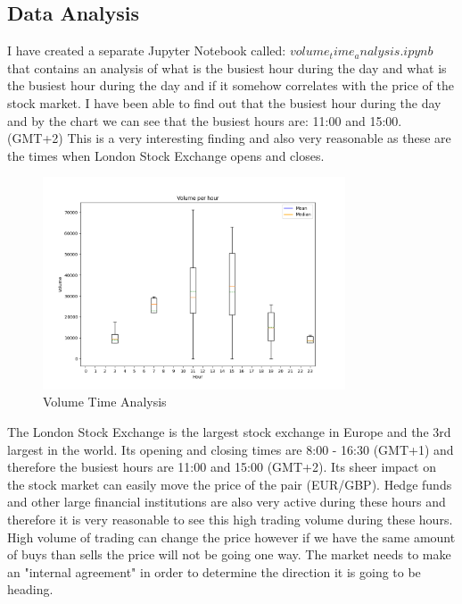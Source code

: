 \documentclass{imc-inf}
\begin{document}
	\subsection{Data Analysis}
	
	I have created a separate Jupyter Notebook called: $volume_time_analysis.ipynb$ that contains an analysis of what is the busiest hour during the day and what is the busiest hour during the 
	day and if it somehow correlates with the price of the stock market. I have been able to find out that the busiest hour during the day and by the 
	chart we can see that the busiest hours are: 11:00 and 15:00. (GMT+2) This is a very interesting finding and also very reasonable as these are the times 
	when London Stock Exchange opens and closes.
	\begin{figure}[h!]
		\centering
		\includegraphics[width=0.8\textwidth]{volumte_time_analysis_histogram.png}
		\caption{Volume Time Analysis}
		\label{fig:volume_time_analysis}
	\end{figure} The London Stock Exchange is the largest stock exchange in Europe and the 3rd largest in the world.
	Its opening and closing times are 8:00 - 16:30 (GMT+1) and therefore the busiest hours are 11:00 and 15:00 (GMT+2). Its sheer impact on the stock market can easily move the 
	price of the pair (EUR/GBP). Hedge funds and other large financial institutions are also very active during these hours and therefore it is very reasonable to see this high trading volume 
	during these hours. High volume of trading can change the price however if we have the same amount of buys than sells the price will not be going one way. The market needs to make 
	an "internal agreement" in order to determine the direction it is going to be heading.
	
\end{document}
